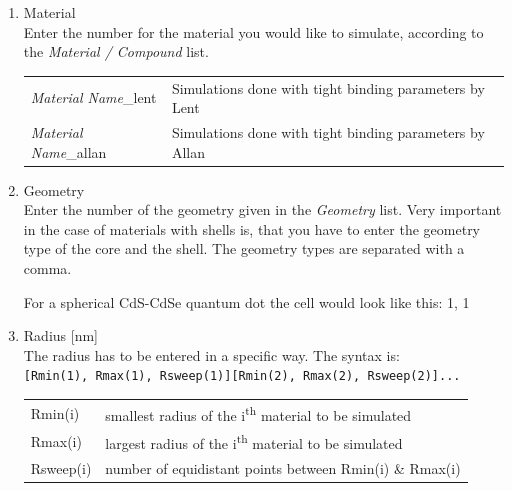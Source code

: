 			\begin{enumerate}
				\item Material		\\
							Enter the number for the material you would like to simulate, according to the {\it Material / Compound} list. \\
							\begin{tabular}{ll}
								{\it Material Name}\_lent		&	Simulations done with tight binding parameters by Lent	\\
								{\it Material Name}\_allan	&	Simulations done with tight binding parameters by Allan	\\
							\end{tabular}
				\item Geometry		\\
							Enter the number of the geometry given in the {\it Geometry} list. Very important in the case of materials with
							shells is, that you have to enter the geometry type of the core and the shell. The geometry types are separated	
							with a comma.
							\begin{EXAMPLE}
								For a spherical CdS-CdSe quantum dot the cell would look like this: 1, 1
							\end{EXAMPLE}
				\item Radius [nm]			\\
							The radius has to be entered in a specific way. The syntax is: 						\\
							\lstinline{[Rmin(1), Rmax(1), Rsweep(1)][Rmin(2), Rmax(2), Rsweep(2)]...} \\
							\newline
							\begin{tabular}{@{}ll}
								Rmin(i)		& smallest radius of the i\textsuperscript{th} material to be simulated		\\
								Rmax(i)		& largest radius of the i\textsuperscript{th} material to be simulated		\\
								Rsweep(i)	& number of equidistant points between Rmin(i) \& Rmax(i)									\\
							\end{tabular}
							

\end{enumerate}
